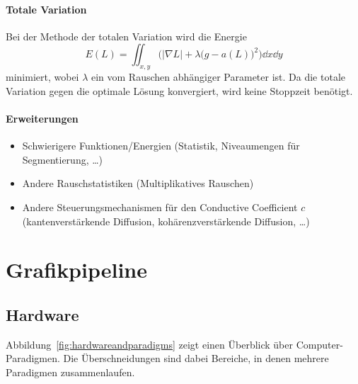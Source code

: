 			\subsubsection{Totale Variation}
				Bei der Methode der totalen Variation wird die Energie
				\begin{equation*}
					E(L) = \iint_{x, y} \! \Big( \lvert \nabla L \rvert + \lambda\big( g - a(L) \big)^2 \Big) \dd{x} \dd{y}
				\end{equation*}
				minimiert, wobei \(\lambda\) ein vom Rauschen abhängiger Parameter ist. Da die totale Variation gegen die optimale Lösung konvergiert, wird keine Stoppzeit benötigt.

			\subsubsection{Erweiterungen}
				\begin{itemize}
					\item Schwierigere Funktionen/Energien (Statistik, Niveaumengen für Segmentierung, \dots)
					\item Andere Rauschstatistiken (\zB Multiplikatives Rauschen)
					\item Andere Steuerungsmechanismen für den Conductive Coefficient \(c\) (\zB kantenverstärkende Diffusion, kohärenzverstärkende Diffusion, \dots)
				\end{itemize}

\chapter{Grafikpipeline}
	\section{Hardware}
		Abbildung~\ref{fig:hardwareandparadigms} zeigt einen Überblick über Computer-Paradigmen. Die Überschneidungen sind dabei Bereiche, in denen mehrere Paradigmen zusammenlaufen.
	
